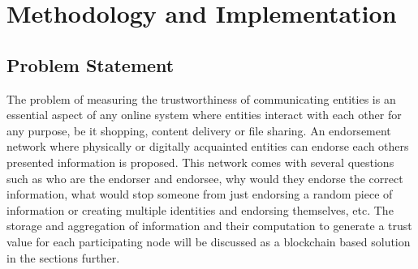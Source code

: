 \chapter{Methodology and Implementation} \label{ch:method}

\section{Problem Statement}
The problem of measuring the trustworthiness of communicating entities is
an essential aspect of any online system where entities interact with 
each other for any purpose, be it shopping, content delivery or file sharing. 
An endorsement network where physically or digitally acquainted entities can
endorse each others presented information is proposed. This network comes with
several questions such as who are the endorser and endorsee, why would they 
endorse the correct information, what would stop someone from just endorsing 
a random piece of information or creating multiple identities and endorsing 
themselves, etc. The storage and aggregation of information and their 
computation to generate a trust value for each participating node will be 
discussed as a blockchain based solution in the sections further. 


